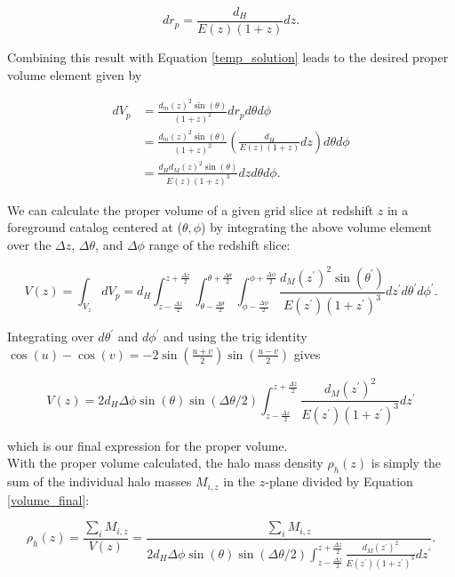 \documentclass[12pt]{article}
\begin{document}
\begin{equation}\label{physical2comoving_inf}
dr_p=\frac{d_H}{E(z)(1+z)}dz.
\end{equation}

Combining this result with Equation \eqref{temp_solution} leads to the desired proper volume element given by

\begin{align}
dV_p&=\frac{d_m(z)^2\sin(\theta)}{(1+z)^2}dr_pd\theta d\phi\nonumber\\
&=\frac{d_m(z)^2\sin(\theta)}{(1+z)^2}\left(\frac{d_H}{E(z)(1+z)}dz\right)d\theta d\phi\nonumber\\
&=\frac{d_Hd_M(z)^2\sin(\theta)}{E(z)(1+z)^3}dzd\theta d\phi.
\end{align}

We can calculate the proper volume of a given grid slice at redshift $z$ in a foreground catalog centered at ($\theta,\phi$) by integrating the above volume element over the $\Delta z$, $\Delta\theta$, and $\Delta\phi$ range of the redshift slice:

\begin{equation}
V(z)=\int_{V_z}dV_p=d_H\int_{z-\frac{\Delta z}{2}}^{z+\frac{\Delta z}{2}}\int_{\theta-\frac{\Delta\theta}{2}}^{\theta+\frac{\Delta\theta}{2}}\int_{\phi-\frac{\Delta\phi}{2}}^{\phi+\frac{\Delta\phi}{2}} \frac{d_M(z^\prime)^2\sin(\theta^\prime)}{E(z^\prime)(1+z^\prime)^3}dz^\prime d\theta^\prime d\phi^\prime.
\end{equation}

Integrating over $d\theta^\prime$ and $d\phi^\prime$ and using the trig identity ${\cos(u)-\cos(v)=-2\sin\left(\frac{u+v}{2}\right)\sin\left(\frac{u-v}{2}\right)}$ gives

\begin{equation}\label{volume_final}
V(z)=2d_H\Delta\phi\sin(\theta)\sin(\Delta\theta/2)\int_{z-\frac{\Delta z}{2}}^{z+\frac{\Delta z}{2}} \frac{d_M(z^\prime)^2}{E(z^\prime)(1+z^\prime)^3}dz^\prime
\end{equation}

which is our final expression for the proper volume.\\

With the proper volume calculated, the halo mass density $\rho_h(z)$ is simply the sum of the individual halo masses $M_{i,z}$ in the $z$-plane divided by Equation \eqref{volume_final}:

\begin{equation}\label{rho_h}
\rho_h(z)=\frac{\sum_i M_{i,z}}{V(z)}=\frac{\sum_i M_{i,z}}{2d_H\Delta\phi\sin(\theta)\sin(\Delta\theta/2)\int_{z-\frac{\Delta z}{2}}^{z+\frac{\Delta z}{2}} \frac{d_M(z^\prime)^2}{E(z^\prime)(1+z^\prime)^3}dz^\prime}.
\end{equation}
\end{document}

